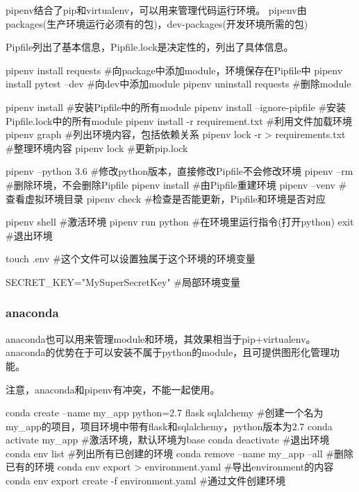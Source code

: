       pipenv结合了pip和virtualenv，可以用来管理代码运行环境。
      pipenv由packages(生产环境运行必须有的包)，dev-packages(开发环境所需的包)

      Pipfile列出了基本信息，Pipfile.lock是决定性的，列出了具体信息。
      \begin{codeblock}[language=python, caption={pipenv}]
        pipenv install requests #向package中添加module，环境保存在Pipfile中
        pipenv install pytest --dev #向dev中添加module
        pipenv uninstall requests #删除module

        pipenv install #安装Pipfile中的所有module
        pipenv install --ignore-pipfile #安装Pipfile.lock中的所有module
        pipenv install -r requirement.txt #利用文件加载环境
        pipenv graph #列出环境内容，包括依赖关系
        pipenv lock -r > requirements.txt #整理环境内容
        pipenv lock #更新pip.lock

        pipenv --python 3.6 #修改python版本，直接修改Pipfile不会修改环境
        pipenv --rm #删除环境，不会删除Pipfile
        pipenv install #由Pipfile重建环境
        pipenv --venv #查看虚拟环境目录
        pipenv check #检查是否能更新，Pipfile和环境是否对应

        pipenv shell #激活环境
        pipenv run python #在环境里运行指令(打开python)
        exit #退出环境 

        touch .env #这个文件可以设置独属于这个环境的环境变量
      \end{codeblock}

      \begin{codeblock}[language=python, caption={.env}]
        SECRET_KEY="MySuperSecretKey" #局部环境变量
      \end{codeblock}

    \subsubsection{anaconda}
      anaconda也可以用来管理module和环境，其效果相当于pip+virtualenv。
      anaconda的优势在于可以安装不属于python的module，且可提供图形化管理功能。

      注意，anaconda和pipenv有冲突，不能一起使用。
      \begin{codeblock}[language=bash, caption={anaconda}]
        conda create --name my_app python=2.7 flask sqlalchemy
        #创建一个名为my\_app的项目，项目环境中带有flask和sqlalchemy，python版本为2.7
        conda activate my_app #激活环境，默认环境为base
        conda deactivate #退出环境
        conda env list #列出所有已创建的环境 
        conda remove --name my_app --all #删除已有的环境
        conda env export > environment.yaml #导出environment的内容
        conda env export create -f environment.yaml #通过文件创建环境
      \end{codeblock}

